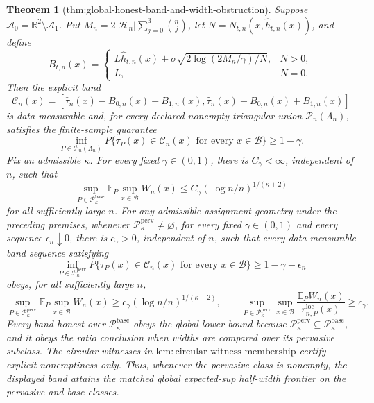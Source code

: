 \documentclass{article}
\newtheorem{theorem}{Theorem}
\begin{document}
\begin{theorem}[thm:global-honest-band-and-width-obstruction]\label{thm:global-honest-band-and-width-obstruction}
Suppose \(\mathcal A_0=\mathbb R^2\setminus\mathcal A_1\). Put \(M_n=2|\mathcal H_n|\sum_{j=0}^3\binom nj\), let \(N=N_{t,n}(x,\widehat h_{t,n}(x))\), and define
\[
 B_{t,n}(x)=
 \begin{cases}
 L\widehat h_{t,n}(x)+\sigma\sqrt{2\log(2M_n/\gamma)/N},&N>0,\\
 L,&N=0.
 \end{cases}
\]
Then the explicit band
\[
 \mathcal C_n(x)=
 \left[\widehat\tau_n(x)-B_{0,n}(x)-B_{1,n}(x),
 \widehat\tau_n(x)+B_{0,n}(x)+B_{1,n}(x)\right]
\]
is data measurable and, for every declared nonempty triangular union \(\mathcal P_n(\Lambda_n)\), satisfies the finite-sample guarantee
\[
 \inf_{P\in\mathcal P_n(\Lambda_n)}P\{\tau_P(x)\in\mathcal C_n(x)\text{ for every }x\in\mathcal B\}\ge1-\gamma.
\]
Fix an admissible \(\kappa\).  For every fixed \(\gamma\in(0,1)\), there is \(C_\gamma<\infty\), independent of \(n\), such that
\[
 \sup_{P\in\mathcal P_{\kappa}^{\mathrm{base}}}
 \mathbb E_P\sup_{x\in\mathcal B}W_n(x)
 \le C_\gamma(\log n/n)^{1/(\kappa+2)}
\]
for all sufficiently large \(n\). For any admissible assignment geometry under the preceding premises, whenever \(\mathcal P_{\kappa}^{\mathrm{perv}}\ne\varnothing\), for every fixed \(\gamma\in(0,1)\) and every sequence \(\epsilon_n\downarrow0\), there is \(c_\gamma>0\), independent of \(n\), such that every data-measurable band sequence satisfying
\[
 \inf_{P\in\mathcal P_{\kappa}^{\mathrm{perv}}}
 P\{\tau_P(x)\in\mathcal C_n(x)\text{ for every }x\in\mathcal B\}
 \ge1-\gamma-\epsilon_n
\]
obeys, for all sufficiently large \(n\),
\[
 \sup_{P\in\mathcal P_{\kappa}^{\mathrm{perv}}}
 \mathbb E_P\sup_{x\in\mathcal B}W_n(x)
 \ge c_\gamma(\log n/n)^{1/(\kappa+2)},
 \qquad
 \sup_{P\in\mathcal P_{\kappa}^{\mathrm{perv}}}\sup_{x\in\mathcal B}
 \frac{\mathbb E_PW_n(x)}{r_{n,P}^{\mathrm{loc}}(x)}
 \ge c_\gamma.
\]
Every band honest over \(\mathcal P_{\kappa}^{\mathrm{base}}\) obeys the global lower bound because \(\mathcal P_{\kappa}^{\mathrm{perv}}\subseteq\mathcal P_{\kappa}^{\mathrm{base}}\), and it obeys the ratio conclusion when widths are compared over its pervasive subclass. The circular witnesses in \(\mathrm{lem:circular\text{-}witness\text{-}membership}\) certify explicit nonemptiness only. Thus, whenever the pervasive class is nonempty, the displayed band attains the matched global expected-sup half-width frontier on the pervasive and base classes.


\end{theorem}
\end{document}
